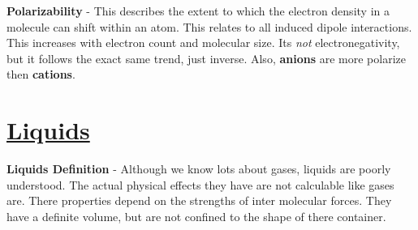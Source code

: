 \documentclass{article}
\begin{document}
\noindent\textbf{Polarizability} - This describes the extent to which the electron density in a molecule can shift within an atom. This relates to all induced dipole interactions. This increases with electron count and molecular size. Its \textit{not} electronegativity, but it follows the exact same trend, just inverse. Also, \textbf{anions} are more polarize then \textbf{cations}.\\
\vspace{-10pt}
\section*{\LARGE\uline{Liquids}}
\newcommand{\randomnessfactor}{0.05}

\begin{minipage}{10cm}
	\textbf{Liquids Definition} - Although we know lots about gases, liquids are poorly understood. The actual physical effects they have are not calculable like gases are. There properties depend on the strengths of inter molecular forces. They have a definite volume, but are not confined to the shape of there container.
\end{minipage}
\end{document}
